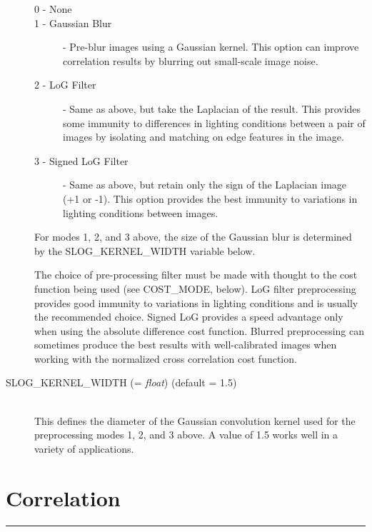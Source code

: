 \begin{description}
  \begin{description}
    \item[0 - None]
    \item[1 - Gaussian Blur] - Pre-blur images using a Gaussian
      kernel.  This option can improve correlation results by blurring
      out small-scale image noise.
    \item[2 - LoG Filter] - Same as above, but take the Laplacian of
      the result.  This provides some immunity to differences in
      lighting conditions between a pair of images by isolating and
      matching on edge features in the image.
    \item[3 - Signed LoG Filter] - Same as above, but retain only the
      sign of the Laplacian image (+1 or -1).  This option provides
      the best immunity to variations in lighting conditions between
      images.
  \end{description}

  For modes 1, 2, and 3 above, the size of the Gaussian blur is
  determined by the SLOG\_KERNEL\_WIDTH variable below.

  The choice of pre-processing filter must be made with thought to the
  cost function being used (see COST\_MODE, below).  LoG filter preprocessing
  provides good immunity to variations in lighting conditions
  and is usually the recommended choice.  Signed LoG provides a speed
  advantage only when using the absolute difference cost function.
  Blurred preprocessing can sometimes produce the best results with
  well-calibrated images when working with the normalized cross
  correlation cost function.

\item[SLOG\_KERNEL\_WIDTH \textnormal{\small{(= \emph{float})}} (default = 1.5)] \hfill \\
  This defines the diameter of the Gaussian convolution kernel used
  for the preprocessing modes 1, 2, and 3 above. A value of 1.5 works
  well in a variety of applications.

\end{description}


\section{Correlation}
\hrule
\bigskip

